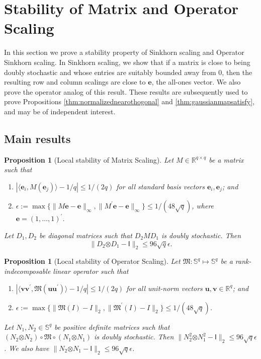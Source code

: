 \documentclass[11pt,letterpaper]{article}
\newtheorem{proposition}[theorem]{Proposition}
\newcommand{\be}{\mathbf{e}}
\newcommand{\bu}{\mathbf{u}}
\newcommand{\bv}{\mathbf{v}}
\newcommand{\botimes}{\boldsymbol \otimes}
\newcommand{\sfi}{\mathsf{I}}
\begin{document}
\section{Stability of Matrix and Operator Scaling} \label{apx:sinkhornstability}

In this section we prove a stability property of Sinkhorn scaling and Operator Sinkhorn scaling.  In Sinkhorn scaling, we show that if a matrix is close to being doubly stochastic and whose entries are suitably bounded away from $0$, then the resulting row and column scalings are close to $\be$, the all-ones vector.  We also prove the operator analog of this result.  These results are subsequently used to prove Propositions \ref{thm:normalizednearothogonal} and \ref{thm:gaussianmapsatisfy}, and may be of independent interest.

\subsection{Main results}

\begin{proposition}[Local stability of Matrix Scaling] \label{thm:sinkhornstability}
	Let $M \in \mathbb{R}^{q\times q}$ be a matrix such that 
	\begin{enumerate}
		\item $|\langle \be_i, M(\be_j)\rangle - 1/q| \leq 1/(2q)$ for all standard basis vectors $\be_i,\be_j$; and
		\item $\epsilon:= \max \{\|M \boldsymbol e - \boldsymbol e\|_{\infty},\| M^{\prime} \boldsymbol e - \boldsymbol e\|_{\infty} \} \leq 1/(48 \sqrt{q})$, where $\be = (1,\ldots,1)^{\prime}$.
	\end{enumerate}
	Let $D_1, D_2$ be diagonal matrices such that $D_2 M D_1$ is doubly stochastic.  Then 
	\begin{equation*}
		\| D_2 \botimes D_1 - \sfi \|_2 \leq 96 \sqrt{q} \epsilon.
	\end{equation*}
\end{proposition}

\begin{proposition}[Local stability of Operator Scaling] \label{thm:oepratorsinkhornstability}
	Let $\mathfrak{M}: \mathbb{S}^{q} \mapsto \mathbb{S}^{q}$ be a rank-indecomposable linear operator such that
	\begin{enumerate}
		\item $|\langle \bv\bv^{\prime}, \mathfrak{M} (\bu \bu^{\prime})\rangle -1/q| \leq 1/(2q)$ for all unit-norm vectors $\bu,\bv \in \mathbb{R}^{q}$; and
		\item $\epsilon:= \max \{ \| \mathfrak{M}(I)-I \|_{2} , \| \mathfrak{M}^{\prime}(I)-I \|_{2}\} \leq 1/(48\sqrt{q})$.
	\end{enumerate}
	Let $N_1, N_2 \in \mathbb{S}^{q}$ be positive definite matrices such that $ (N_2 \botimes N_2) \circ \mathfrak{M} \circ (N_1 \botimes N_1) $ is doubly stochastic.  Then $\| N_2^2 \botimes N_1^2 - \sfi \|_2 \leq 96 \sqrt{q} \epsilon$.  We also have $\| N_2 \botimes N_1 - \sfi \|_2 \leq 96 \sqrt{q} \epsilon$.
\end{proposition}
\end{document}
